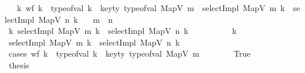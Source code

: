 \begin{isabellebody}
\ \ \ {\isachardoublequoteopen}{\isasymforall}k{\isachardot}{\kern0pt}\ {\isacharparenleft}{\kern0pt}wf\ k\ {\isasymand}\ type{\isacharunderscore}{\kern0pt}of{\isacharunderscore}{\kern0pt}val\ k\ {\isacharequal}{\kern0pt}\ key{\isacharunderscore}{\kern0pt}ty\ {\isacharparenleft}{\kern0pt}type{\isacharunderscore}{\kern0pt}of{\isacharunderscore}{\kern0pt}val\ {\isacharparenleft}{\kern0pt}MapV\ m{\isacharparenright}{\kern0pt}{\isacharparenright}{\kern0pt}{\isacharparenright}{\kern0pt}\ {\isasymlongrightarrow}\ selectImpl\ {\isacharparenleft}{\kern0pt}MapV\ m{\isacharparenright}{\kern0pt}\ k\ {\isacharequal}{\kern0pt}\ selectImpl\ {\isacharparenleft}{\kern0pt}MapV\ n{\isacharparenright}{\kern0pt}\ k{\isachardoublequoteclose}\isanewline
\ \ \ {\isachardoublequoteopen}m\ {\isacharequal}{\kern0pt}\ n{\isachardoublequoteclose}\isanewline
%
\isadelimproof
%
\endisadelimproof
%
\isatagproof
{}\isamarkupfalse%
\ {\isacharminus}{\kern0pt}\isanewline
\ \ \isamarkupfalse%
\ {\isachardoublequoteopen}{\isasymAnd}k{\isachardot}{\kern0pt}\ selectImpl\ {\isacharparenleft}{\kern0pt}MapV\ m{\isacharparenright}{\kern0pt}\ k\ {\isacharequal}{\kern0pt}\ selectImpl\ {\isacharparenleft}{\kern0pt}MapV\ n{\isacharparenright}{\kern0pt}\ k{\isachardoublequoteclose}\isanewline
\ \ \isamarkupfalse%
\ {\isacharminus}{\kern0pt}\isanewline
\ \ \ \ \isamarkupfalse%
\ k\ \isamarkupfalse%
\ {\isachardoublequoteopen}selectImpl\ {\isacharparenleft}{\kern0pt}MapV\ m{\isacharparenright}{\kern0pt}\ k\ {\isacharequal}{\kern0pt}\ selectImpl\ {\isacharparenleft}{\kern0pt}MapV\ n{\isacharparenright}{\kern0pt}\ k{\isachardoublequoteclose}\isanewline
\ \ \ \ \isamarkupfalse%
\ {\isacharparenleft}{\kern0pt}cases\ {\isachardoublequoteopen}{\isacharparenleft}{\kern0pt}wf\ k\ {\isasymand}\ type{\isacharunderscore}{\kern0pt}of{\isacharunderscore}{\kern0pt}val\ k\ {\isacharequal}{\kern0pt}\ key{\isacharunderscore}{\kern0pt}ty\ {\isacharparenleft}{\kern0pt}type{\isacharunderscore}{\kern0pt}of{\isacharunderscore}{\kern0pt}val\ {\isacharparenleft}{\kern0pt}MapV\ m{\isacharparenright}{\kern0pt}{\isacharparenright}{\kern0pt}{\isacharparenright}{\kern0pt}{\isachardoublequoteclose}{\isacharparenright}{\kern0pt}\isanewline
\ \ \ \ \ \ \isamarkupfalse%
\ True\isanewline
\ \ \ \ \ \ \isamarkupfalse%
\ \isamarkupfalse%
\ {\isacharquery}{\kern0pt}thesis\ \isamarkupfalse%

\end{isabellebody}

